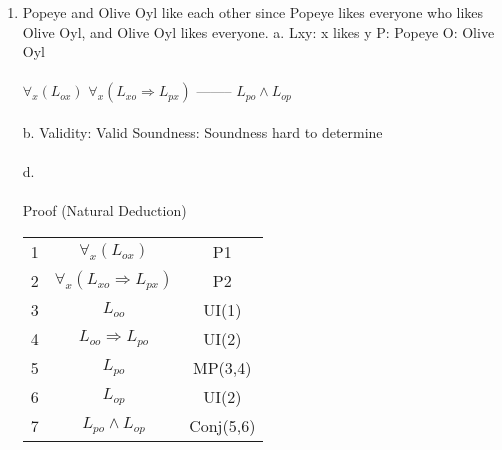 \documentclass[]{article}
\begin{document}
\begin{enumerate}
    \item Popeye and Olive Oyl like each other since Popeye likes everyone who likes Olive Oyl, and Olive Oyl likes everyone.
    \newline a.
    \newline Lxy: x likes y
    \newline P: Popeye
    \newline O: Olive Oyl
    \\\\ $\forall_x (L_{ox})$
    \newline $\forall_x (L_{xo} \Rightarrow L_{px})$
    \newline --------
    \newline $L_{po} \land L_{op}$
    \\\\b.
    \newline Validity: Valid
    \newline Soundness: Soundness hard to determine
    \\\\d.
    \\\\ Proof (Natural Deduction)
    \begin{tabular}{c| c | c}
        1 & $\forall_x (L_{ox})$ & P1 \\
        2 & $\forall_x(L_{xo}\Rightarrow L_{px})$ & P2 \\
        3 & $L_{oo}$ & UI(1) \\
        4 & $L_{oo}\Rightarrow L_{po}$ & UI(2) \\
        5 & $L_{po}$ & MP(3,4) \\
        6 & $L_{op}$ & UI(2) \\
        7 & $L_{po}\land L_{op}$ & Conj(5,6)
    \end{tabular}


\end{enumerate}
\end{document}

